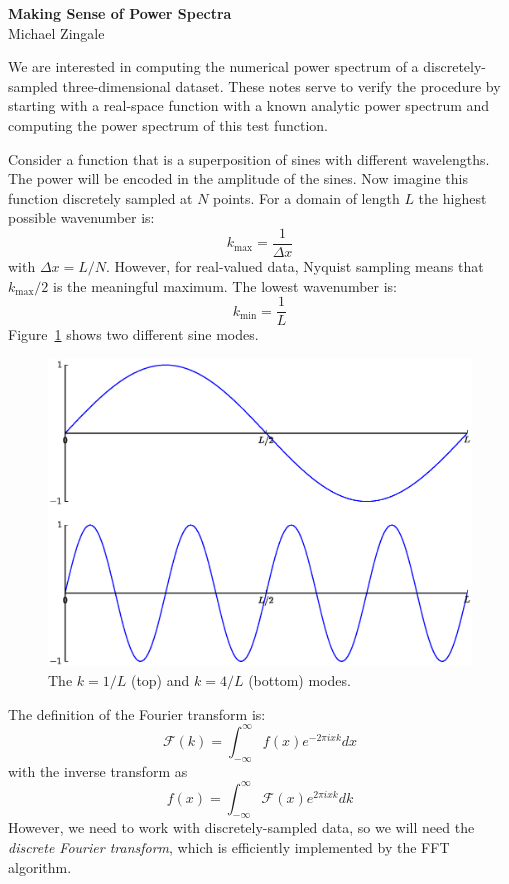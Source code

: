 \documentclass[11pt]{article}
\begin{document}
\begin{center}
{\bfseries \sffamily \LARGE Making Sense of Power Spectra} \\
Michael Zingale
\end{center}

We are interested in computing the numerical power spectrum of a
discretely-sampled three-dimensional dataset.  These notes serve
to verify the procedure by starting with a real-space
function with a known analytic power spectrum and computing the
power spectrum of this test function.

Consider a function that is a superposition of sines with different
wavelengths.  The power will be encoded in the amplitude of the sines.
Now imagine this function discretely sampled at $N$ points.  For a domain of
length $L$ the highest possible wavenumber is:
\begin{equation}
k_\mathrm{max} = \frac{1}{\Delta x}
\end{equation}
with $\Delta x = L/N$.  However, for real-valued data, Nyquist sampling
means that $k_\mathrm{max}/2$ is the meaningful maximum.
The lowest wavenumber is:
\begin{equation}
k_\mathrm{min} = \frac{1}{L}
\end{equation}
Figure~\ref{fig:wavenumbers} shows two different sine modes.

\suppressfloats

\begin{figure}[t]
\centering
\includegraphics[width=0.6\linewidth]{wavenumber}
\caption{\label{fig:wavenumbers} The $k = 1/L$ (top) and $k = 4/L$ (bottom)
modes.}
\end{figure}


The definition of the Fourier transform is:
\begin{equation}
\mathcal{F}(k) = \int_{-\infty}^{\infty} f(x) e^{-2\pi i x k} dx
\end{equation}
with the inverse transform as
\begin{equation}
f(x) = \int_{-\infty}^{\infty} \mathcal{F}(x) e^{2\pi i x k} dk
\end{equation}
However, we need to work with discretely-sampled data, so we will need
the {\em discrete Fourier transform}, which is efficiently implemented by
the FFT algorithm.
\end{document}

